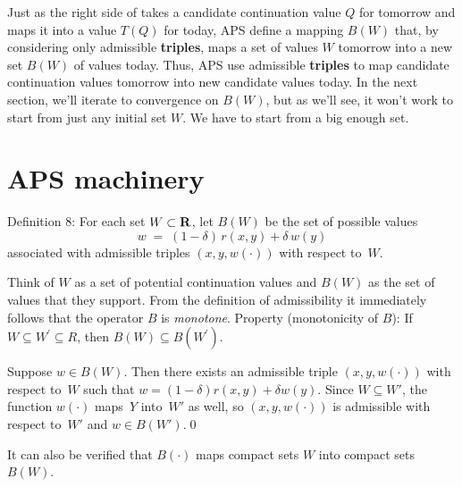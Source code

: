   Just as the right  side of  takes a candidate continuation value
 $Q$ for tomorrow
and maps it  into a value $T(Q)$ for today,
APS define a mapping $B(W)$ that, by considering only
admissible {\bf triples}, maps a set of values $W$ tomorrow into a new
set $B(W)$ of values today.
Thus, APS use admissible {\bf triples} to map candidate
continuation values tomorrow into new candidate values today.
In the next section, we'll iterate to convergence on $B(W)$,
 but as we'll see,
it won't work to start from just any initial set $W$. We have to start
from a big enough set.

\section{APS machinery}

\medskip\noindent
{\sc Definition 8:}
For each set $W\subset{\bf R}$, let $B(W)$ be the set of possible
values
$$  w \;=\; (1-\delta)\,r(x,y)+\delta\,w(y)  $$
associated with admissible triples $(x,y,w(\cdot))$ with respect
to~$W$.


\medskip
 Think of
$W$ as a set of potential continuation values and $B(W)$ as the
set of values that they support. From the
definition of admissibility it immediately follows that the operator $B$ is
{\it monotone}.
\medskip\noindent
{\sc Property} (monotonicity of $B$):  If $W\subseteq W^\prime \subseteq R$,
then $B(W) \subseteq B(W^\prime)$.

\medskip
{}
Suppose $w\in B(W)$.  Then there exists an admissible triple
$(x,y,w(\cdot))$ with respect to~$W$ such that
$w=(1-\delta)r(x,y)+\delta w(y)$.  Since $W\subseteq W'$, the function
$w(\cdot)$ maps~$Y$ into~$W'$ as well, so $(x,y,w(\cdot))$ is
admissible with respect to~$W'$ and $w\in B(W')$.\qed


\medskip
It can also be verified that $B(\cdot)$ maps compact sets $W$ into compact
sets $B(W)$.

